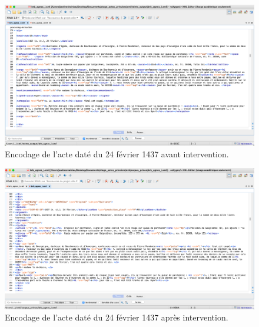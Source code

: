 \begin{figure}[H]
    \centering
    \includegraphics[scale=0.3]{img/teinte_agnes.png}
    \caption{Encodage de l'acte daté du 24 février 1437 avant intervention.}
    \label{fig:encodage_avant}
\end{figure}

\begin{figure}[H]
    \centering
    \includegraphics[scale=0.3]{img/restruct_agnes.png}
    \caption{Encodage de l'acte daté du 24 février 1437 après intervention.}
    \label{fig:encodage_après}
\end{figure}
\newpage 

